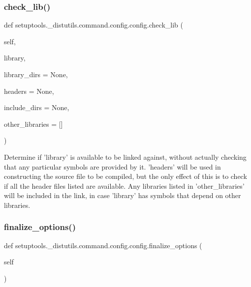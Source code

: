 \subsubsection{\texorpdfstring{check\+\_\+lib()}{check\_lib()}}
{\footnotesize\ttfamily def setuptools.\+\_\+distutils.\+command.\+config.\+config.\+check\+\_\+lib (\begin{DoxyParamCaption}\item[{}]{self,  }\item[{}]{library,  }\item[{}]{library\+\_\+dirs = {\ttfamily None},  }\item[{}]{headers = {\ttfamily None},  }\item[{}]{include\+\_\+dirs = {\ttfamily None},  }\item[{}]{other\+\_\+libraries = {\ttfamily \mbox{[}\mbox{]}} }\end{DoxyParamCaption})}

\begin{DoxyVerb}Determine if 'library' is available to be linked against,
without actually checking that any particular symbols are provided
by it.  'headers' will be used in constructing the source file to
be compiled, but the only effect of this is to check if all the
header files listed are available.  Any libraries listed in
'other_libraries' will be included in the link, in case 'library'
has symbols that depend on other libraries.
\end{DoxyVerb}
 \mbox{\label{classsetuptools_1_1__distutils_1_1command_1_1config_1_1config_a1b7c7fbb7934e5ac73bf41d03e1a105b}} 
\subsubsection{\texorpdfstring{finalize\+\_\+options()}{finalize\_options()}}
{\footnotesize\ttfamily def setuptools.\+\_\+distutils.\+command.\+config.\+config.\+finalize\+\_\+options (\begin{DoxyParamCaption}\item[{}]{self }\end{DoxyParamCaption})}

